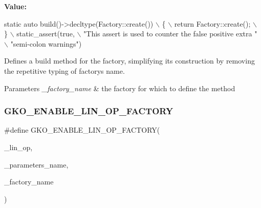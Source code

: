 {\bfseries Value\+:}
\begin{DoxyCode}
\textcolor{keyword}{static} \textcolor{keyword}{auto} build()->decltype(Factory::create())                         \(\backslash\)
    \{                                                                        \(\backslash\)
        return Factory::create();                                            \(\backslash\)
    \}                                                                        \(\backslash\)
    static\_assert(\textcolor{keyword}{true},                                                      \(\backslash\)
                  \textcolor{stringliteral}{"This assert is used to counter the false positive extra "} \(\backslash\)
                  \textcolor{stringliteral}{"semi-colon warnings"})
\end{DoxyCode}


Defines a build method for the factory, simplifying its construction by removing the repetitive typing of factory\textquotesingle{}s name. 


\begin{DoxyParams}{Parameters}
{\em \+\_\+factory\+\_\+name} & the factory for which to define the method \\
\hline
\end{DoxyParams}
\mbox{\label{group__LinOp_ga8e0af90ec2414b768266f77cedffc309}} 
\subsubsection{\texorpdfstring{G\+K\+O\+\_\+\+E\+N\+A\+B\+L\+E\+\_\+\+L\+I\+N\+\_\+\+O\+P\+\_\+\+F\+A\+C\+T\+O\+RY}{GKO\_ENABLE\_LIN\_OP\_FACTORY}}
{\footnotesize\ttfamily \#define G\+K\+O\+\_\+\+E\+N\+A\+B\+L\+E\+\_\+\+L\+I\+N\+\_\+\+O\+P\+\_\+\+F\+A\+C\+T\+O\+RY(\begin{DoxyParamCaption}\item[{}]{\+\_\+lin\+\_\+op,  }\item[{}]{\+\_\+parameters\+\_\+name,  }\item[{}]{\+\_\+factory\+\_\+name }\end{DoxyParamCaption})}

